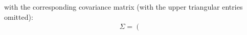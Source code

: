 \iffalse
 with the corresponding covariance matrix (with the upper triangular entries omitted):
\begin{align}
 \Sigma =
\left(
\begin{array}{rrrrr}
%
%

\end{array}
\end{align}
